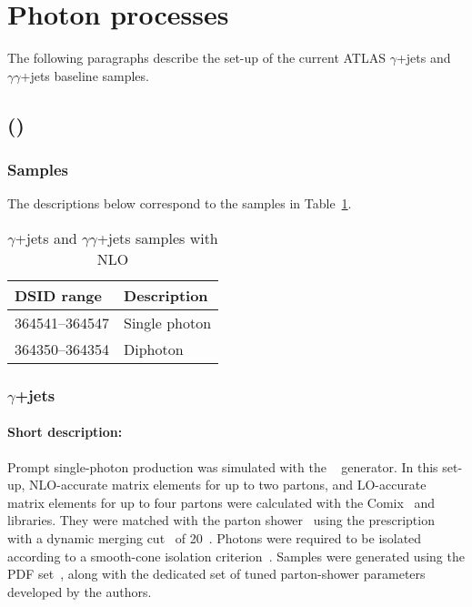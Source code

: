 \section{Photon processes}

The following paragraphs describe the set-up of the current ATLAS $\gamma$+jets and $\gamma\gamma$+jets baseline samples. 

\subsection[Sherpa (MEPS@NLO)]{\SHERPA (\MEPSatNLO)}

\subsubsection*{Samples}

The descriptions below correspond to the samples in Table~\ref{tab:gammajets-sherpa-nlo}.
\begin{table}[!htbp]
\begin{center}
\caption{$\gamma$+jets and $\gamma\gamma$+jets samples with \SHERPA NLO} \label{tab:gammajets-sherpa-nlo}
\begin{tabular}{ l | l }
\hline
DSID range & Description \\
\hline
364541--364547 &  Single photon \\ 
364350--364354 &  Diphoton  \\
\hline
\end{tabular}
\end{center}
\end{table}



\subsubsection{$\gamma$+jets}


\paragraph{Short description:}

Prompt single-photon production was simulated with the
\SHERPA[2.2]~\cite{Bothmann:2019yzt} generator. In this set-up, NLO-accurate
matrix elements for up to two partons, and LO-accurate matrix elements for up
to four partons were calculated with the Comix~\cite{Gleisberg:2008fv} and
\OPENLOOPS~\cite{Buccioni:2019sur,Cascioli:2011va,Denner:2016kdg} libraries. They were matched
with the \SHERPA parton shower~\cite{Schumann:2007mg} using the \MEPSatNLO
prescription~\cite{Hoeche:2011fd,Hoeche:2012yf,Catani:2001cc,Hoeche:2009rj}
with a dynamic merging cut~\cite{Siegert:2016bre} of 20~\GeV.
Photons were required to be isolated according to
a smooth-cone isolation criterion~\cite{Frixione:1998jh}. Samples were generated using the
\NNPDF[3.0nnlo] PDF set~\cite{Ball:2014uwa}, along with the dedicated set of
tuned parton-shower parameters developed by the \SHERPA authors.

